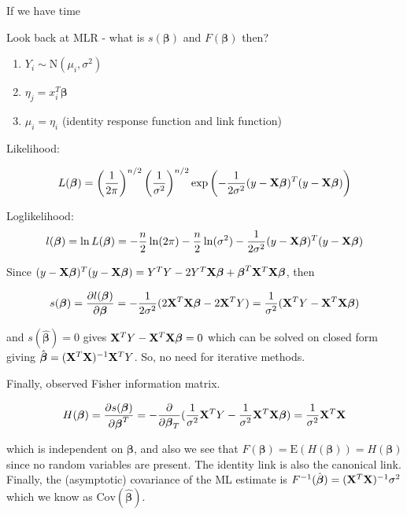 \documentclass[
  ignorenonframetext,
]{beamer}
\begin{document}
\begin{frame}
If we have time
\end{frame}

\begin{frame}
\begin{block}{Look back at MLR - what is \(s(\boldsymbol{\beta})\) and
\(F(\boldsymbol{\beta})\) then?}
\label{look-back-at-mlr---what-is-sboldsymbolbeta-and-fboldsymbolbeta-then}
\begin{enumerate}
\item
  \(Y_i \sim \text{N}(\mu_i, \sigma^2)\)
\item
  \(\eta_j = x_i^T\boldsymbol{\beta}\)
\item
  \(\mu_i = \eta_i\) (identity response function and link function)
\end{enumerate}

Likelihood:

\[L(\boldsymbol{\beta}) = \left(\frac{1}{2\pi}\right)^{n/2}\left(\frac{1}{\sigma^2}\right)^{n/2} \exp\left(-\frac{1}{2\sigma^2}(y-{\bf X}\boldsymbol{\beta})^T(y-{\bf X}\boldsymbol{\beta})\right)\]

Loglikelihood:
\[l(\boldsymbol{\beta}) = \ln L(\boldsymbol{\beta}) = -\frac{n}{2} \ln (2\pi) - \frac{n}{2} \ln (\sigma^2) - \frac{1}{2\sigma^2}(y-{\bf X}\boldsymbol{\beta})^T(y-{\bf X}\boldsymbol{\beta})\]
\end{block}
\end{frame}

\begin{frame}
Since
\((y-{\bf X}\boldsymbol{\beta})^T(y-{\bf X}\boldsymbol{\beta}) = Y^TY - 2Y^T{\bf X}\boldsymbol{\beta}  + \boldsymbol{\beta}^T{\bf X}^T{\bf X}\boldsymbol{\beta}\),
then

\[s(\boldsymbol{\beta}) = \frac{\partial l(\boldsymbol{\beta})}{\partial \boldsymbol{\beta}} = -\frac{1}{2\sigma^2}(2{\bf X}^T{\bf X}\boldsymbol{\beta}-2{\bf X}^TY) = \frac{1}{\sigma^2}({\bf X}^TY - {\bf X}^T{\bf X}\boldsymbol{\beta})\]

and \(s(\hat{\boldsymbol{\beta}}) = 0\) gives
\({\bf X}^TY - {\bf X}^T{\bf X}\boldsymbol{\beta} = 0\) which can be
solved on closed form giving
\(\hat{\boldsymbol{\beta}} = ({\bf X}^T{\bf X})^{-1}{\bf X}^TY\). So, no
need for iterative methods.
\end{frame}

\begin{frame}
Finally, observed Fisher information matrix.

\[H(\boldsymbol{\beta}) = \frac{\partial s(\boldsymbol{\beta})}{\partial \boldsymbol{\beta}^T} = -\frac{\partial}{\partial \boldsymbol{\beta}_T}(\frac{1}{\sigma^2}{\bf X}^TY - \frac{1}{\sigma^2}{\bf X}^T{\bf X}\boldsymbol{\beta}) = \frac{1}{\sigma^2}{\bf X}^T{\bf X}\]

which is independent on \(\boldsymbol{\beta}\), and also we see that
\(F(\boldsymbol{\beta})=\text{E}(H(\boldsymbol{\beta}))=H(\boldsymbol{\beta})\)
since no random variables are present. The identity link is also the
canonical link. Finally, the (asymptotic) covariance of the ML estimate
is \(F^{-1}(\hat{\boldsymbol{\beta}})=({\bf X}^T{\bf X})^{-1}\sigma^2\)
which we know as \(\text{Cov}(\hat{\boldsymbol{\beta}})\).
\end{frame}
\end{document}
